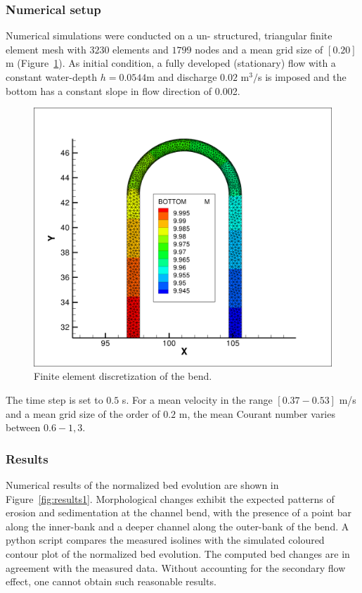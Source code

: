 %
%
\subsubsection{Numerical setup}
%
Numerical simulations were conducted on a un-
structured, triangular finite element mesh with
$3230$ elements and $1799$ nodes and a mean grid size of $[0.20]$ m (Figure~\ref{fig:mesh}). 
As initial condition, a fully developed (stationary) flow with a constant water-depth $h = 0.0544$m and discharge $0.02$ 
m$^3/$s is imposed and the bottom has a constant slope in flow direction of 0.002. 

\begin{figure} [!h]
\centering
\includegraphics[scale=0.15, bb=0 0 100 100]{img/yen_grid_bottom.png}
 \caption{Finite element discretization of the bend.}\label{fig:mesh}
\end{figure}

The time step is set to $0.5$ s. For a mean velocity in the range $[0.37-0.53]$ m/s and 
a mean grid size of the order of $0.2$ m, the mean Courant number varies between $0.6-1,3$. 

\subsubsection{Results}
%
Numerical results of the normalized bed evolution are shown in Figure~\ref{fig:results1}. Morphological changes exhibit the expected
patterns of erosion and sedimentation at the channel bend, with the presence of a point bar along the inner-bank and a deeper 
channel along the outer-bank of the bend. A python script compares the measured isolines with the simulated coloured contour plot 
of the normalized bed evolution. 
The computed bed changes are in agreement with the measured data. Without accounting for the secondary flow effect, one cannot 
obtain such reasonable results. 

